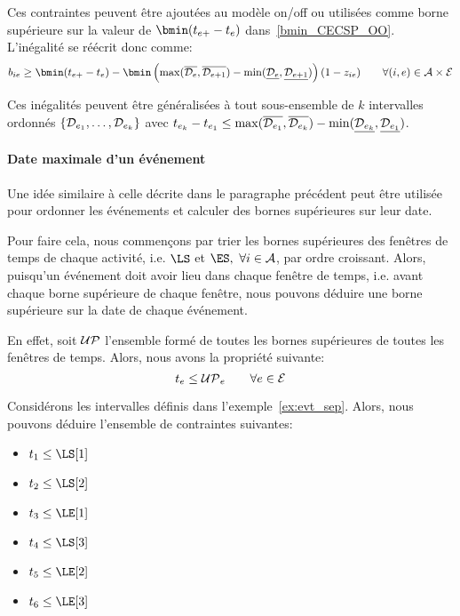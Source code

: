 Ces contraintes peuvent être ajoutées au modèle on/off ou utilisées
comme borne supérieure sur la valeur de $\bmin(t_{e+}-t_e)$
dans~\eqref{bmin_CECSP_OO}. L'inégalité se réécrit donc comme:
\[ b_{ie} \ge \bmin(t_{e+}-t_e) - \bmin\left(\max(\overline{{\cal
D}_e},\overline{{\cal D}_{e+1}}) - \min(\underline{{\cal
D}_e},\underline{{\cal D}_{e+1}})\right)(1-z_{ie})\qquad \forall (i,e)
\in {\cal A}\times{\cal E}
\]

Ces inégalités peuvent être généralisées à tout sous-ensemble de $k$
intervalles ordonnés $\{{\cal D}_{e_1},\dots,{\cal D}_{e_k}\}$ avec
$t_{e_k}-t_{e_1} \le \max(\overline{{\cal D}_{e_1}},\overline{{\cal
D}_{e_k}}) - \min(\underline{{\cal D}_{e_k}},\underline{{\cal
D}_{e_1}}) $.

\paragraph{Date maximale d'un événement}


Une idée similaire à celle décrite dans le paragraphe précédent peut
être utilisée pour ordonner les événements et calculer des bornes
supérieures sur leur date. 

Pour faire cela, nous commençons par trier les bornes supérieures des
fenêtres de temps de chaque activité, i.e. $\LS$ et $\ES,\ \forall i
\in \A$, par ordre croissant. Alors, puisqu'un événement doit avoir
lieu dans chaque fenêtre de temps, i.e. avant chaque borne supérieure de
chaque fenêtre, nous pouvons déduire une borne supérieure sur la date
de chaque événement.

En effet, soit ${\cal UP}$ l'ensemble formé de toutes les bornes
supérieures de toutes les fenêtres de temps. Alors, nous avons la
propriété suivante: 
\begin{equation} \label {Bte_CECSP_OO} t_e \le {\cal UP}_e \qquad
\forall e \in {\cal E}
\end{equation}

\begin{ex} 
Considérons les intervalles définis dans
l'exemple~\ref{ex:evt_sep}. Alors, nous pouvons déduire l'ensemble de
contraintes suivantes:

\begin{itemize}
\item $t_1 \le \LS[1]$
\item $t_2 \le \LS[2]$
\item $t_3 \le \LE[1]$
\item $t_4 \le \LS[3]$
\item $t_5 \le \LE[2]$
\item $t_6 \le \LE[3]$
\end{itemize}
\end{ex}

